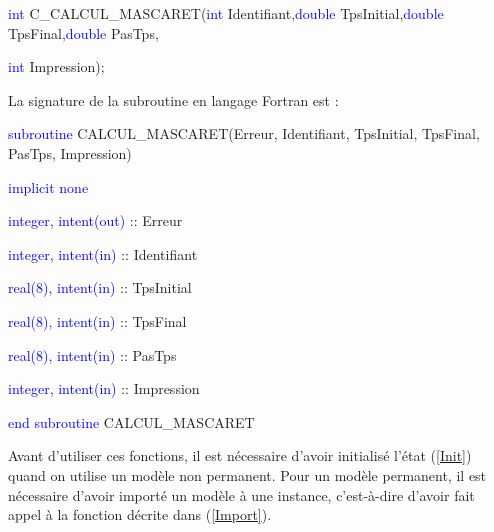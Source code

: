 \documentclass[a4paper,11pt]{article}
\begin{document}
 \vspace{0.5cm}
 
 \textcolor{blue}{int} C\_CALCUL\_MASCARET(\textcolor{blue}{int} Identifiant,\textcolor{blue}{double} TpsInitial,\textcolor{blue}{double} TpsFinal,\textcolor{blue}{double} PasTps,
 
 \textcolor{blue}{int} Impression);
 
 \vspace{0.5cm} 

 La signature de la subroutine en langage Fortran est :
 
 \vspace{0.5cm}
 
    \textcolor{blue}{subroutine} CALCUL\_MASCARET(Erreur, Identifiant, TpsInitial, TpsFinal, PasTps, Impression)
    
        \hspace{1cm}\textcolor{blue}{implicit none}                 
        
        \hspace{1cm} \textcolor{blue}{integer, intent(out)} :: Erreur
        
        \hspace{1cm} \textcolor{blue}{integer, intent(in)}  :: Identifiant
        
        \hspace{1cm} \textcolor{blue}{real(8), intent(in)}  :: TpsInitial
        
        \hspace{1cm} \textcolor{blue}{real(8), intent(in)}  :: TpsFinal
        
        \hspace{1cm} \textcolor{blue}{real(8), intent(in)}  :: PasTps
        
        \hspace{1cm} \textcolor{blue}{integer, intent(in)}  :: Impression
        
    \textcolor{blue}{end subroutine} CALCUL\_MASCARET

 \vspace{0.5cm}
 
 Avant d'utiliser ces fonctions, il est n\'ecessaire d'avoir initialis\'e l'\'etat (\ref{Init}) quand on utilise un mod\`ele non permanent. Pour un mod\`ele permanent, il est n\'ecessaire d'avoir import\'e un mod\`ele \`a une instance, c'est-\`a-dire d'avoir fait appel \`a la fonction d\'ecrite dans (\ref{Import}).

 \vspace{0.5cm}
\end{document}
